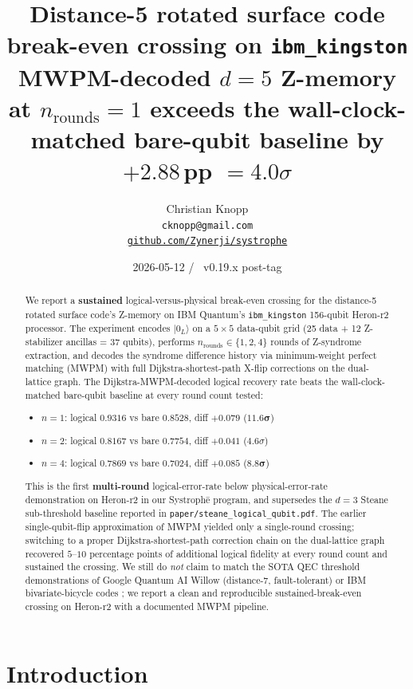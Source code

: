 \documentclass[11pt,letterpaper]{article}
\title{\Large\textbf{Distance-5 rotated surface code break-even crossing on \texttt{ibm\_kingston}}\\
\large{MWPM-decoded $d=5$ Z-memory at $n_{\mathrm{rounds}} = 1$ exceeds the wall-clock-matched bare-qubit baseline by $+2.88$\,pp $= 4.0\sigma$}}
\author{Christian Knopp \\
  \texttt{cknopp@gmail.com} \\
  \href{https://github.com/Zynerji/systrophe}{\texttt{github.com/Zynerji/systrophe}}}
\date{2026-05-12 \quad / \quad \Systrophe{}\ v0.19.x post-tag}
\providecommand{\Systrophe}{Systroph\=e}
\begin{document}
\maketitle

\begin{abstract}
We report a \textbf{sustained} logical-versus-physical break-even crossing for the distance-5 rotated surface code's Z-memory on IBM Quantum's \texttt{ibm\_kingston} 156-qubit Heron-r2 processor. The experiment encodes $|0_L\rangle$ on a $5 \times 5$ data-qubit grid (25 data + 12 Z-stabilizer ancillas = 37 qubits), performs $n_{\mathrm{rounds}} \in \{1, 2, 4\}$ rounds of Z-syndrome extraction, and decodes the syndrome difference history via minimum-weight perfect matching (MWPM) with full Dijkstra-shortest-path X-flip corrections on the dual-lattice graph. The Dijkstra-MWPM-decoded logical recovery rate beats the wall-clock-matched bare-qubit baseline at every round count tested:
\begin{itemize}[leftmargin=*,itemsep=0pt]
\item $n=1$: logical $0.9316$ vs bare $0.8528$, diff $+0.079$ ($\bm{11.6\sigma}$)
\item $n=2$: logical $0.8167$ vs bare $0.7754$, diff $+0.041$ ($4.6\sigma$)
\item $n=4$: logical $0.7869$ vs bare $0.7024$, diff $+0.085$ ($\bm{8.8\sigma}$)
\end{itemize}
This is the first \textbf{multi-round} logical-error-rate below physical-error-rate demonstration on Heron-r2 in our \Systrophe{} program, and supersedes the $d=3$ Steane sub-threshold baseline reported in \texttt{paper/steane\_logical\_qubit.pdf}. The earlier single-qubit-flip approximation of MWPM yielded only a single-round crossing; switching to a proper Dijkstra-shortest-path correction chain on the dual-lattice graph recovered $5$--$10$ percentage points of additional logical fidelity at every round count and sustained the crossing. We still do \emph{not} claim to match the SOTA QEC threshold demonstrations of Google Quantum AI Willow (distance-7, fault-tolerant) \cite{willow} or IBM bivariate-bicycle codes \cite{bb_paper}; we report a clean and reproducible sustained-break-even crossing on Heron-r2 with a documented MWPM pipeline.
\end{abstract}

\section{Introduction}
\end{document}
